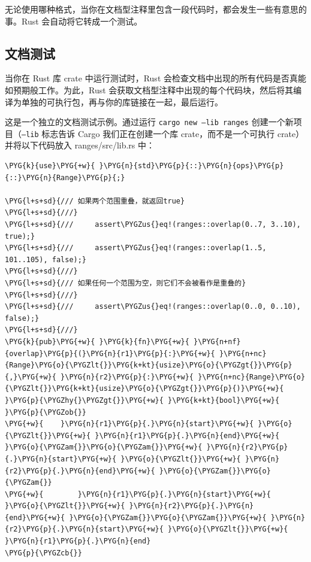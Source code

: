 无论使用哪种格式，当你在文档型注释里包含一段代码时，都会发生一些有意思的事。Rust 会自动将它转成一个测试。

\subsection{文档测试}

当你在 Rust 库 crate 中运行测试时，Rust 会检查文档中出现的所有代码是否真能如预期般工作。为此，Rust 会获取文档型注释中出现的每个代码块，然后将其编译为单独的可执行包，再与你的库链接在一起，最后运行。

这是一个独立的文档测试示例。通过运行 \texttt{cargo new --lib ranges} 创建一个新项目（\texttt{--lib} 标志告诉 Cargo 我们正在创建一个库 crate，而不是一个可执行 crate）并将以下代码放入 ranges/\allowbreak{}src/\allowbreak{}lib.rs 中：

\begin{Verbatim}[commandchars=\\\{\},breaklines=true,breakanywhere=true,fontsize=\codefont,xleftmargin=17bp]
\PYG{k}{use}\PYG{+w}{ }\PYG{n}{std}\PYG{p}{::}\PYG{n}{ops}\PYG{p}{::}\PYG{n}{Range}\PYG{p}{;}

\PYG{l+s+sd}{/// 如果两个范围重叠，就返回true}
\PYG{l+s+sd}{///}
\PYG{l+s+sd}{///     assert\PYGZus{}eq!(ranges::overlap(0..7, 3..10), true);}
\PYG{l+s+sd}{///     assert\PYGZus{}eq!(ranges::overlap(1..5, 101..105), false);}
\PYG{l+s+sd}{///}
\PYG{l+s+sd}{/// 如果任何一个范围为空，则它们不会被看作是重叠的}
\PYG{l+s+sd}{///}
\PYG{l+s+sd}{///     assert\PYGZus{}eq!(ranges::overlap(0..0, 0..10), false);}
\PYG{l+s+sd}{///}
\PYG{k}{pub}\PYG{+w}{ }\PYG{k}{fn}\PYG{+w}{ }\PYG{n+nf}{overlap}\PYG{p}{(}\PYG{n}{r1}\PYG{p}{:}\PYG{+w}{ }\PYG{n+nc}{Range}\PYG{o}{\PYGZlt{}}\PYG{k+kt}{usize}\PYG{o}{\PYGZgt{}}\PYG{p}{,}\PYG{+w}{ }\PYG{n}{r2}\PYG{p}{:}\PYG{+w}{ }\PYG{n+nc}{Range}\PYG{o}{\PYGZlt{}}\PYG{k+kt}{usize}\PYG{o}{\PYGZgt{}}\PYG{p}{)}\PYG{+w}{ }\PYG{p}{\PYGZhy{}\PYGZgt{}}\PYG{+w}{ }\PYG{k+kt}{bool}\PYG{+w}{ }\PYG{p}{\PYGZob{}}
\PYG{+w}{    }\PYG{n}{r1}\PYG{p}{.}\PYG{n}{start}\PYG{+w}{ }\PYG{o}{\PYGZlt{}}\PYG{+w}{ }\PYG{n}{r1}\PYG{p}{.}\PYG{n}{end}\PYG{+w}{ }\PYG{o}{\PYGZam{}}\PYG{o}{\PYGZam{}}\PYG{+w}{ }\PYG{n}{r2}\PYG{p}{.}\PYG{n}{start}\PYG{+w}{ }\PYG{o}{\PYGZlt{}}\PYG{+w}{ }\PYG{n}{r2}\PYG{p}{.}\PYG{n}{end}\PYG{+w}{ }\PYG{o}{\PYGZam{}}\PYG{o}{\PYGZam{}}
\PYG{+w}{        }\PYG{n}{r1}\PYG{p}{.}\PYG{n}{start}\PYG{+w}{ }\PYG{o}{\PYGZlt{}}\PYG{+w}{ }\PYG{n}{r2}\PYG{p}{.}\PYG{n}{end}\PYG{+w}{ }\PYG{o}{\PYGZam{}}\PYG{o}{\PYGZam{}}\PYG{+w}{ }\PYG{n}{r2}\PYG{p}{.}\PYG{n}{start}\PYG{+w}{ }\PYG{o}{\PYGZlt{}}\PYG{+w}{ }\PYG{n}{r1}\PYG{p}{.}\PYG{n}{end}
\PYG{p}{\PYGZcb{}}
\end{Verbatim}


